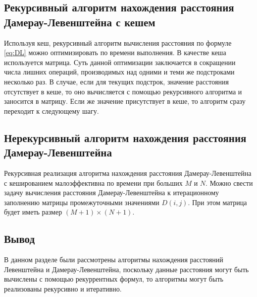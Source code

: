 \subsection{Рекурсивный алгоритм нахождения расстояния Дамерау-Левенштейна с кешем}

Используя кеш, рекурсивный алгоритм вычисления расстояния по формуле \eqref{eq:DL} можно оптимизировать по времени выполнения.  В качестве кеша используется матрица. Суть данной оптимизации заключается в сокращении числа лишних операций, производимых над одними и теми же подстроками несколько раз. В случае, если для текущих подстрок, значение расстояния отсутствует в кеше, то оно вычисляется с помощью рекурсивного алгоритма и заносится в матрицу. Если же значение присутствует в кеше, то алгоритм сразу переходит к следующему шагу.

\subsection{Нерекурсивный алгоритм нахождения расстояния Дамерау-Левенштейна}

Рекурсивная реализация алгоритма нахождения расстояния Дамерау-Левенштейна с кешированием малоэффективна по времени при больших $M$ и $N$. Можно свести задачу вычисления расстояния Дамерау-Левенштейна к итерационному заполнению матрицы промежуточными значениями $D(i, j)$. При этом матрица будет иметь размер $(M+1) \times (N+1)$.

\subsection*{Вывод}
В данном разделе были рассмотрены алгоритмы нахождения расстояний Левенштейна и Дамерау-Левенштейна, поскольку данные расстояния могут быть вычислены с помощью рекуррентных формул, то алгоритмы могут быть реализованы рекурсивно и итеративно. 


